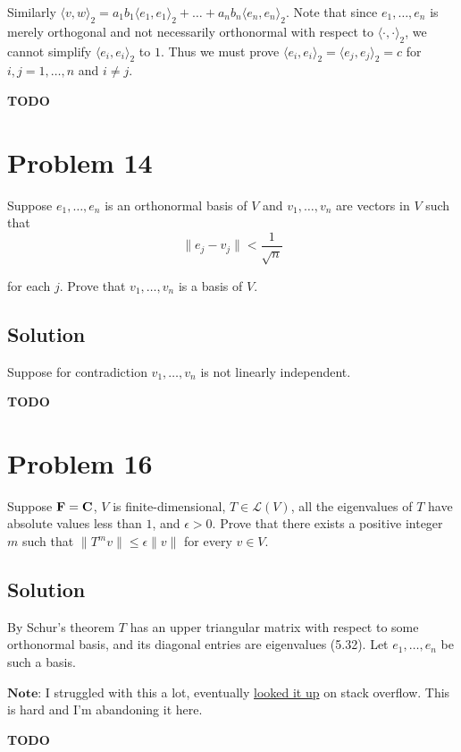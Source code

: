 \documentclass{article}
\begin{document}
Similarly $\langle v,w\rangle_2=a_1b_1\langle e_1, e_1 \rangle_2+\ldots+a_n b_n\langle e_n, e_n \rangle_2$. Note that since $e_1,\ldots,e_n$ is merely orthogonal and not necessarily orthonormal with respect to $\langle \cdot,\cdot\rangle_2$, we cannot simplify $\langle e_i,e_i\rangle_2$ to $1$. Thus we must prove $\langle e_i,e_i\rangle_2=\langle e_j,e_j\rangle_2=c$ for $i,j=1,\ldots,n$ and $i\neq j$.

\vs
\textbf{TODO}

\section*{Problem 14}
Suppose $e_1,\ldots,e_n$ is an orthonormal basis of $V$ and $v_1,\ldots,v_n$ are vectors in $V$ such that
\[\|e_j-v_j\|<\frac{1}{\sqrt{n}}\]

for each $j$. Prove that $v_1,\ldots,v_n$ is a basis of $V$.

\subsection*{Solution}
Suppose for contradiction $v_1,\ldots,v_n$ is not linearly independent.

\vs
\textbf{TODO}

\section*{Problem 16}
Suppose $\mathbf{F}=\mathbf{C}$, $V$ is finite-dimensional, $T\in\mathcal{L}(V)$, all the eigenvalues of $T$ have absolute values less than $1$, and $\epsilon>0$. Prove that there exists a positive integer $m$ such that $\|T^mv\|\leq\epsilon\|v\|$ for every $v\in V$.

\subsection*{Solution}
By Schur's theorem $T$ has an upper triangular matrix with respect to some orthonormal basis, and its diagonal entries are eigenvalues (5.32). Let $e_1,\ldots,e_n$ be such a basis.

\vs

$\textbf{Note:}$ I struggled with this a lot, eventually \href{https://math.stackexchange.com/questions/4759025/linear-algebra-done-right-exercise-6-b-16}{looked it up} on stack overflow. This is hard and I'm abandoning it here.

\vs
\textbf{TODO}
\end{document}
